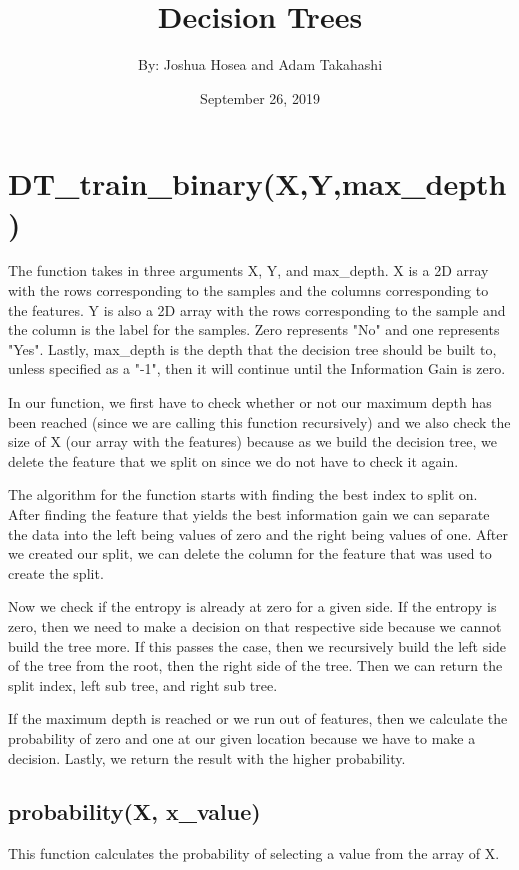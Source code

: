 \documentclass{article}
\title{Decision Trees}
\author{By: Joshua Hosea and Adam Takahashi}
\date{September 26, 2019}
\begin{document}
\maketitle 

\section{ DT\_train\_binary(X,Y,max\_depth) }
The function takes in three arguments X, Y, and max\_depth. X is a 2D array with the rows corresponding to the samples and the columns corresponding to the features. Y is also a 2D array with the rows corresponding to the sample and the column is the label for the samples. Zero represents "No" and one represents "Yes". Lastly, max\_depth is the depth that the decision tree should be built to, unless specified as a "-1", then it will continue until the Information Gain is zero. 
\par In our function, we first have to check whether or not our maximum depth has been reached (since we are calling this function recursively) and we also check the size of X (our array with the features) because as we build the decision tree, we delete the feature that we split on since we do not have to check it again. 
\par The algorithm for the function starts with finding the best index to split on. After finding the feature that yields the best information gain we can separate the data into the left being values of zero and the right being values of one. After we created our split, we can delete the column for the feature that was used to create the split.
\par Now we check if the entropy is already at zero for a given side. If the entropy is zero, then we need to make a decision on that respective side because we cannot build the tree more. If this passes the case, then we recursively build the left side of the tree from the root, then the right side of the tree. Then we can return the split index, left sub tree, and right sub tree. 
\par If the maximum depth is reached or we run out of features, then we calculate the probability of zero and one at our given location because we have to make a decision. Lastly, we return the result with the higher probability.

\subsection{probability(X, x\_value)}
This function calculates the probability of selecting a value from the array of X.
\end{document}
